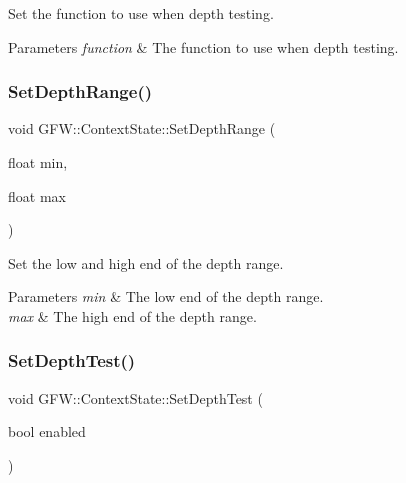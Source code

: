 Set the function to use when depth testing. 


\begin{DoxyParams}{Parameters}
{\em function} & The function to use when depth testing. \\
\hline
\end{DoxyParams}
\mbox{\label{class_g_f_w_1_1_context_state_af2ead11abc05ce454e09d4357f70015d}} 
\subsubsection{\texorpdfstring{Set\+Depth\+Range()}{SetDepthRange()}}
{\footnotesize\ttfamily void G\+F\+W\+::\+Context\+State\+::\+Set\+Depth\+Range (\begin{DoxyParamCaption}\item[{float}]{min,  }\item[{float}]{max }\end{DoxyParamCaption})}



Set the low and high end of the depth range. 


\begin{DoxyParams}{Parameters}
{\em min} & The low end of the depth range. \\
\hline
{\em max} & The high end of the depth range. \\
\hline
\end{DoxyParams}
\mbox{\label{class_g_f_w_1_1_context_state_aa4dc94bfca31669f31ab8953a06ca456}} 
\subsubsection{\texorpdfstring{Set\+Depth\+Test()}{SetDepthTest()}}
{\footnotesize\ttfamily void G\+F\+W\+::\+Context\+State\+::\+Set\+Depth\+Test (\begin{DoxyParamCaption}\item[{bool}]{enabled }\end{DoxyParamCaption})}



